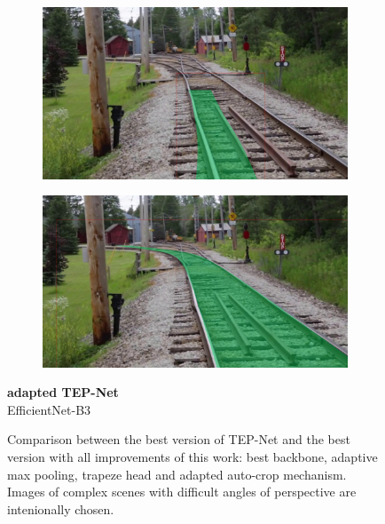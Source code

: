 \begin{figure}[H]
\begin{minipage}{0.6\textwidth}
        \begin{subfigure}[b]{0.48\textwidth}
            \centering
            \includegraphics[width=\textwidth]{PICs/experiments/ComparisonBaselineToImproved/original3.jpg}
        \end{subfigure}
        \begin{subfigure}[b]{0.48\textwidth}
            \centering
            \includegraphics[width=\textwidth]{PICs/experiments/ComparisonBaselineToImproved/adapted3.jpg}
        \end{subfigure}
    \end{minipage}%
    \hfill
    \begin{minipage}{0.2\textwidth} %
        \centering
        \textbf{adapted TEP-Net}\\
        EfficientNet-B3
    \end{minipage}
    \caption{Comparison between the best version of TEP-Net \cite{tepNet2024} and the best version with all improvements of this work: best backbone, adaptive max pooling, trapeze head and adapted auto-crop mechanism.
    Images of complex scenes with difficult angles of perspective are intenionally chosen.}
    \label{fig:comparisonBaseline2Improved}
\end{figure}

